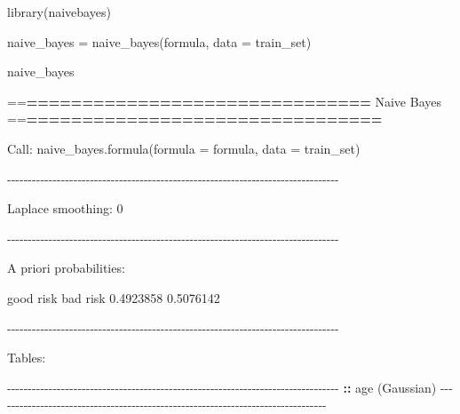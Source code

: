 \documentclass[
  11pt,
]{book}
\makeatletter
\newenvironment{Shaded}{}{}
\newcommand{\AttributeTok}[1]{#1}
\newcommand{\DecValTok}[1]{#1}
\newcommand{\ErrorTok}[1]{\textcolor[rgb]{0.21,0.21,0.21}{\textbf{#1}}}
\newcommand{\FloatTok}[1]{#1}
\newcommand{\FunctionTok}[1]{#1}
\newcommand{\NormalTok}[1]{#1}
\newcommand{\OtherTok}[1]{\textcolor[rgb]{0.39,0.39,0.39}{#1}}
\newcommand{\SpecialCharTok}[1]{\textcolor[rgb]{0.39,0.39,0.39}{#1}}
\newenvironment{kframe}{%
\medskip{}
\setlength{\fboxsep}{.8em}
 \def\at@end@of@kframe{}%
 \ifinner\ifhmode%
  \def\at@end@of@kframe{\end{minipage}}%
  \begin{minipage}{\columnwidth}%
 \fi\fi%
 \def\FrameCommand##1{\hskip\@totalleftmargin \hskip-\fboxsep
 \colorbox{shadecolor}{##1}\hskip-\fboxsep
     \hskip-\linewidth \hskip-\@totalleftmargin \hskip\columnwidth}%
 \MakeFramed {\advance\hsize-\width
   \@totalleftmargin\z@ \linewidth\hsize
   \@setminipage}}%
 {\par\unskip\endMakeFramed%
 \at@end@of@kframe}
\renewenvironment{Shaded}{\begin{kframe}}{\end{kframe}}
\theoremstyle{definition}
\theoremstyle{definition}
\theoremstyle{definition}
\theoremstyle{definition}
\theoremstyle{remark}
\makeatother
\begin{document}
\begin{Shaded}
\begin{Highlighting}[]
\FunctionTok{library}\NormalTok{(naivebayes)}

\NormalTok{naive\_bayes }\OtherTok{=} \FunctionTok{naive\_bayes}\NormalTok{(formula, }\AttributeTok{data =}\NormalTok{ train\_set)}

\NormalTok{naive\_bayes}
   
   \SpecialCharTok{==}\ErrorTok{===============================}\NormalTok{ Naive Bayes }\SpecialCharTok{==}\ErrorTok{================================}
   
\NormalTok{   Call}\SpecialCharTok{:}
   \FunctionTok{naive\_bayes.formula}\NormalTok{(}\AttributeTok{formula =}\NormalTok{ formula, }\AttributeTok{data =}\NormalTok{ train\_set)}
   
   \SpecialCharTok{{-}{-}{-}{-}{-}{-}{-}{-}{-}{-}{-}{-}{-}{-}{-}{-}{-}{-}{-}{-}{-}{-}{-}{-}{-}{-}{-}{-}{-}{-}{-}{-}{-}{-}{-}{-}{-}{-}{-}{-}{-}{-}{-}{-}{-}{-}{-}{-}{-}{-}{-}{-}{-}{-}{-}{-}{-}{-}{-}{-}{-}{-}{-}{-}{-}{-}{-}{-}{-}{-}{-}{-}{-}{-}{-}{-}{-}{-}{-}{-}} 
    
\NormalTok{   Laplace smoothing}\SpecialCharTok{:} \DecValTok{0}
   
   \SpecialCharTok{{-}{-}{-}{-}{-}{-}{-}{-}{-}{-}{-}{-}{-}{-}{-}{-}{-}{-}{-}{-}{-}{-}{-}{-}{-}{-}{-}{-}{-}{-}{-}{-}{-}{-}{-}{-}{-}{-}{-}{-}{-}{-}{-}{-}{-}{-}{-}{-}{-}{-}{-}{-}{-}{-}{-}{-}{-}{-}{-}{-}{-}{-}{-}{-}{-}{-}{-}{-}{-}{-}{-}{-}{-}{-}{-}{-}{-}{-}{-}{-}} 
    
\NormalTok{   A priori probabilities}\SpecialCharTok{:} 
   
\NormalTok{   good risk  bad risk }
   \FloatTok{0.4923858} \FloatTok{0.5076142} 
   
   \SpecialCharTok{{-}{-}{-}{-}{-}{-}{-}{-}{-}{-}{-}{-}{-}{-}{-}{-}{-}{-}{-}{-}{-}{-}{-}{-}{-}{-}{-}{-}{-}{-}{-}{-}{-}{-}{-}{-}{-}{-}{-}{-}{-}{-}{-}{-}{-}{-}{-}{-}{-}{-}{-}{-}{-}{-}{-}{-}{-}{-}{-}{-}{-}{-}{-}{-}{-}{-}{-}{-}{-}{-}{-}{-}{-}{-}{-}{-}{-}{-}{-}{-}} 
    
\NormalTok{   Tables}\SpecialCharTok{:} 
   
   \SpecialCharTok{{-}{-}{-}{-}{-}{-}{-}{-}{-}{-}{-}{-}{-}{-}{-}{-}{-}{-}{-}{-}{-}{-}{-}{-}{-}{-}{-}{-}{-}{-}{-}{-}{-}{-}{-}{-}{-}{-}{-}{-}{-}{-}{-}{-}{-}{-}{-}{-}{-}{-}{-}{-}{-}{-}{-}{-}{-}{-}{-}{-}{-}{-}{-}{-}{-}{-}{-}{-}{-}{-}{-}{-}{-}{-}{-}{-}{-}{-}{-}{-}} 
   \ErrorTok{::} \FunctionTok{age}\NormalTok{ (Gaussian) }
   \SpecialCharTok{{-}{-}{-}{-}{-}{-}{-}{-}{-}{-}{-}{-}{-}{-}{-}{-}{-}{-}{-}{-}{-}{-}{-}{-}{-}{-}{-}{-}{-}{-}{-}{-}{-}{-}{-}{-}{-}{-}{-}{-}{-}{-}{-}{-}{-}{-}{-}{-}{-}{-}{-}{-}{-}{-}{-}{-}{-}{-}{-}{-}{-}{-}{-}{-}{-}{-}{-}{-}{-}{-}{-}{-}{-}{-}{-}{-}{-}{-}{-}{-}} 
         

\end{Highlighting}
\end{Shaded}
\end{document}

